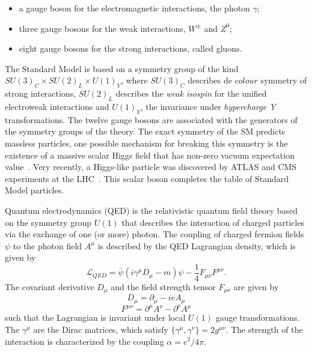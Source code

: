 \begin{itemize}\addtolength{\itemsep}{-0.4\baselineskip}
\item
a gauge boson for the electromagnetic interactions, the photon $\gamma$; 
\item
three gauge bosons for the weak interactions, $W^{\pm}$ and $Z^0$;
\item
eight gauge bosons for the strong interactions, called gluons. 
\end{itemize}


The Standard Model is based on a symmetry group of the kind $SU(3)_C \times SU(2)_L \times U(1)_Y$, where $SU(3)_C$ describes de $colour$ symmetry of strong interactions, $SU(2)_L$ describes the \emph{weak isospin} for the unified electroweak interactions and $U(1)_Y$, the invariance under \emph{hypercharge Y} transformations. The twelve gauge bosons are associated with the generators of the symmetry groups of the theory. The exact symmetry of the SM predicts massless particles, one possible mechanism for breaking this symmetry is the existence of a massive scalar Higgs field that has non-zero vacuum expectation value~\cite{Higgs1964132}. Very recently, a Higgs-like particle was discovered by ATLAS and CMS experiments at the LHC~\cite{ATLASHiggs}. This scalar boson completes the table of Standard Model particles. %


Quantum electrodynamics (QED) is the relativistic quantum field theory based on the symmetry group $U(1)$ that describes the interaction of charged particles via the exchange of one (or more) photon. %
The coupling of charged fermion fields $\psi$ to the photon field $A^{\mu}$ is described by the QED Lagrangian density, which is given by
%
\begin{equation}
\mathcal{L}_{QED} = \bar{\psi} (i\gamma^{\mu}D_{\mu} - m)\psi- \frac{1}{4} F_{\mu\nu}F^{\mu\nu}.
\end{equation}
%
The covariant derivative $D_{\mu}$ and the field strength tensor $F_{\mu\nu}$ are given by
%
\begin{equation}
D_{\mu} = \partial_{\mu} - i e A_{\mu} 
\end{equation}
\begin{equation}
F^{\mu\nu} = \partial^{\mu} A^{\nu} -  \partial^{\nu} A^{\mu}
\end{equation}
%
such that the Lagrangian is invariant under local $U(1)$ gauge transformations. The $\gamma^{\mu}$ are the Dirac matrices, which satisfy  $ \{ \gamma^{\mu},\gamma^{\nu} \} = 2g^{\mu\nu}$. The strength of the interaction is characterized by the coupling $\alpha = e^2/4\pi$.

